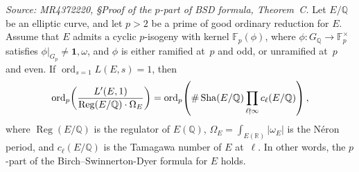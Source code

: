 \begin{theorem}
  \label{thm:thmC}
  \textit{Source: MR4372220, \S{}Proof of the $p$-part of BSD formula, Theorem~C.}
  Let $E/\mathbb{Q}$ be an elliptic curve, and let $p > 2$ be a prime of good
  ordinary reduction for $E$. Assume that $E$ admits a cyclic $p$-isogeny with
  kernel $\mathbb{F}_p(\phi)$, where $\phi : G_{\mathbb{Q}} \to \mathbb{F}_p^\times$
  satisfies $\phi|_{G_p} \neq \mathbf{1}, \omega$, and $\phi$ is either ramified
  at~$p$ and odd, or unramified at~$p$ and even.
  If $\operatorname{ord}_{s=1} L(E, s) = 1$, then
  \[
    \operatorname{ord}_p\!\left(\frac{L'(E, 1)}{\operatorname{Reg}(E/\mathbb{Q}) \cdot \Omega_E}\right)
    =
    \operatorname{ord}_p\!\left(\#\operatorname{Sha}(E/\mathbb{Q})\prod_{\ell \nmid \infty} c_\ell(E/\mathbb{Q})\right),
  \]
  where $\operatorname{Reg}(E/\mathbb{Q})$ is the regulator of $E(\mathbb{Q})$,
  $\Omega_E = \int_{E(\mathbb{R})} |\omega_E|$ is the N\'{e}ron period, and
  $c_\ell(E/\mathbb{Q})$ is the Tamagawa number of $E$ at~$\ell$.
  In other words, the $p$-part of the Birch--Swinnerton-Dyer formula for $E$ holds.
\end{theorem}

